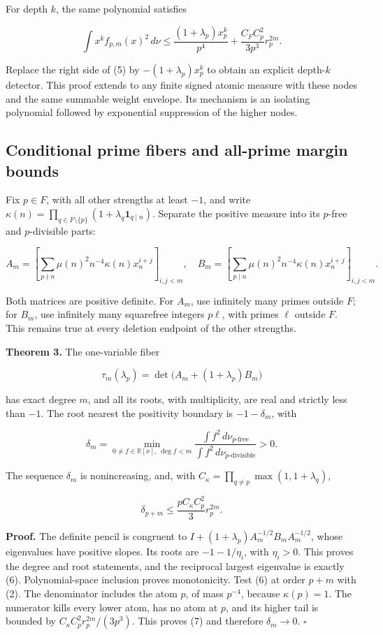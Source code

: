 For depth \(k\), the same polynomial satisfies

\[
\int x^k f_{p,m}(x)^2\,d\nu
\le\frac{(1+\lambda_p)x_p^k}{p^4}
+\frac{C_F C_p^2}{3p^3}r_p^{2m}.
\]

Replace the right side of (5) by \(-(1+\lambda_p)x_p^k\) to obtain an
explicit depth-\(k\) detector. This proof extends to any finite signed
atomic measure with these nodes and the same summable weight envelope.
Its mechanism is an isolating polynomial followed by exponential
suppression of the higher nodes.

\hypertarget{conditional-prime-fibers-and-all-prime-margin-bounds}{%
\subsection{Conditional prime fibers and all-prime margin
bounds}\label{conditional-prime-fibers-and-all-prime-margin-bounds}}

Fix \(p\in F\), with all other strengths at least \(-1\), and write
\(\kappa(n)=\prod_{q\in F\setminus\{p\}}(1+\lambda_q\mathbf1_{q\mid n})\).
Separate the positive measure into its \(p\)-free and \(p\)-divisible
parts:

\[
A_m=[\sum_{p\nmid n}\mu(n)^2n^{-4}\kappa(n)x_n^{i+j}]_{i,j<m},
\quad
B_m=[\sum_{p\mid n}\mu(n)^2n^{-4}\kappa(n)x_n^{i+j}]_{i,j<m}.
\]

Both matrices are positive definite. For \(A_m\), use infinitely many
primes outside \(F\); for \(B_m\), use infinitely many squarefree
integers \(p\ell\), with primes \(\ell\) outside \(F\). This remains
true at every deletion endpoint of the other strengths.

\textbf{Theorem 3.} The one-variable fiber

\[
\tau_m(\lambda_p)=\det\bigl(A_m+(1+\lambda_p)B_m\bigr)
\]

has exact degree \(m\), and all its roots, with multiplicity, are real
and strictly less than \(-1\). The root nearest the positivity boundary
is \(-1-\delta_m\), with

\[
\delta_m=\min_{0\ne f\in\mathbb R[x],\ \deg f<m}
\frac{\int f^2\,d\nu_{p\text{-free}}}{\int f^2\,d\nu_{p\text{-divisible}}}>0.
\tag{6}
\]

The sequence \(\delta_m\) is nonincreasing, and, with
\(C_\kappa=\prod_{q\ne p}\max(1,1+\lambda_q)\),

\[
\boxed{\delta_{p+m}\le\frac{p C_\kappa C_p^2}{3}r_p^{2m}.}
\tag{7}
\]

\textbf{Proof.} The definite pencil is congruent to
\(I+(1+\lambda_p)A_m^{-1/2}B_mA_m^{-1/2}\), whose eigenvalues have
positive slopes. Its roots are \(-1-1/\eta_i\), with \(\eta_i>0\). This
proves the degree and root statements, and the reciprocal largest
eigenvalue is exactly (6). Polynomial-space inclusion proves
monotonicity. Test (6) at order \(p+m\) with (2). The denominator
includes the atom \(p\), of mass \(p^{-4}\), because \(\kappa(p)=1\).
The numerator kills every lower atom, has no atom at \(p\), and its
higher tail is bounded by \(C_\kappa C_p^2r_p^{2m}/(3p^3)\). This proves
(7) and therefore \(\delta_m\to0\). \(\square\)

